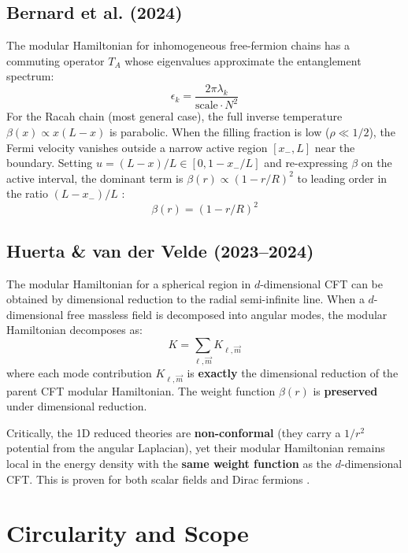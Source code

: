 \documentclass[11pt,letterpaper]{article}
\begin{document}
\subsection{Bernard et al. (2024)}

The modular Hamiltonian for inhomogeneous free-fermion chains has a commuting
operator $T_A$ whose eigenvalues approximate the entanglement spectrum:
\begin{equation}
  \epsilon_k = \frac{2\pi \lambda_k}{\mathrm{scale} \cdot N^2}
  \label{eq:bernard_eigen}
\end{equation}
For the Racah chain (most general case), the full inverse temperature
$\beta(x) \propto x(L-x)$ is parabolic. When the filling fraction is low
($\rho \ll 1/2$), the Fermi velocity vanishes outside a narrow active region
$[x_-, L]$ near the boundary. Setting $u = (L-x)/L \in [0, 1-x_-/L]$ and
re-expressing $\beta$ on the active interval, the dominant term is
$\beta(r) \propto (1-r/R)^2$ to leading order in the ratio $(L-x_-)/L$
\citep{bernard2024}:
\begin{equation}
  \beta(r) = (1 - r/R)^2
  \label{eq:racah_weight}
\end{equation}

\subsection{Huerta \& van der Velde (2023--2024)}

The modular Hamiltonian for a spherical region in $d$-dimensional CFT can be
obtained by dimensional reduction to the radial semi-infinite line. When a
$d$-dimensional free massless field is decomposed into angular modes, the
modular Hamiltonian decomposes as:
\begin{equation}
  K = \sum_{\ell, \vec{m}} K_{\ell, \vec{m}}
  \label{eq:huerta_decomp}
\end{equation}
where each mode contribution $K_{\ell, \vec{m}}$ is \textbf{exactly} the dimensional
reduction of the parent CFT modular Hamiltonian. The weight function $\beta(r)$
is \textbf{preserved} under dimensional reduction.

Critically, the 1D reduced theories are \textbf{non-conformal} (they carry a
$1/r^2$ potential from the angular Laplacian), yet their modular Hamiltonian
remains local in the energy density with the \textbf{same weight function} as the
$d$-dimensional CFT. This is proven for both scalar fields and Dirac fermions
\citep{huerta2023a, huerta2023b}.

\section{Circularity and Scope}
\label{sec:scope}
\end{document}
